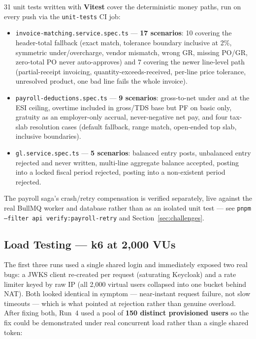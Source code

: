 \documentclass[11pt,a4paper]{article}
\newcommand{\code}[1]{\texttt{\small #1}}
\begin{document}
31 unit tests written with \textbf{Vitest} cover the deterministic money paths, run on
every push via the \code{unit-tests} CI job:
\begin{itemize}
  \item \code{invoice-matching.service.spec.ts} --- \textbf{17 scenarios}: 10 covering
  the header-total fallback (exact match, tolerance boundary inclusive at 2\%, symmetric
  under/overcharge, vendor mismatch, wrong GR, missing PO/GR, zero-total PO never
  auto-approves) and 7 covering the newer line-level path (partial-receipt invoicing,
  quantity-exceeds-received, per-line price tolerance, unresolved product, one bad line
  fails the whole invoice).
  \item \code{payroll-deductions.spec.ts} --- \textbf{9 scenarios}: gross-to-net under
  and at the ESI ceiling, overtime included in gross/TDS base but PF on basic only,
  gratuity as an employer-only accrual, never-negative net pay, and four tax-slab
  resolution cases (default fallback, range match, open-ended top slab, inclusive
  boundaries).
  \item \code{gl.service.spec.ts} --- \textbf{5 scenarios}: balanced entry posts,
  unbalanced entry rejected and never written, multi-line aggregate balance accepted,
  posting into a locked fiscal period rejected, posting into a non-existent period
  rejected.
\end{itemize}
The payroll saga's crash/retry compensation is verified separately, live against the
real BullMQ worker and database rather than as an isolated unit test --- see
\code{pnpm --filter api verify:payroll-retry} and Section~\ref{sec:challenges}.

\subsection{Load Testing --- k6 at 2{,}000 VUs}

The first three runs used a single shared login and immediately exposed two real bugs:
a JWKS client re-created per request (saturating Keycloak) and a rate limiter keyed by
raw IP (all 2{,}000 virtual users collapsed into one bucket behind NAT). Both looked
identical in symptom --- near-instant request failure, not slow timeouts --- which is
what pointed at rejection rather than genuine overload. After fixing both, Run~4 used a
pool of \textbf{150 distinct provisioned users} so the fix could be demonstrated under
real concurrent load rather than a single shared token:
\end{document}
